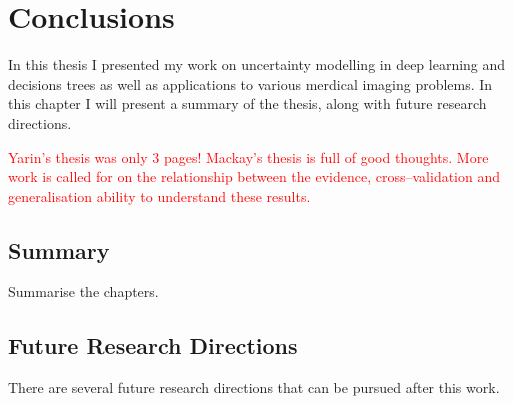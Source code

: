 \chapter{Conclusions} \label{chapter:conclusions}

In this thesis I presented my work on uncertainty modelling in deep learning and decisions trees as well as applications to various merdical imaging problems. In this chapter I will present a summary of the thesis, along with future research directions. 

\textcolor{red}{Yarin's thesis was only 3 pages!}
\textcolor{red}{Mackay's thesis is full of good thoughts. More work is called for on the relationship between the evidence, cross–validation and generalisation ability to understand these results.}

\section{Summary}
\label{sec:conSum}
Summarise the chapters. 

\section{Future Research Directions}
There are several future research directions that can be pursued after this work.
